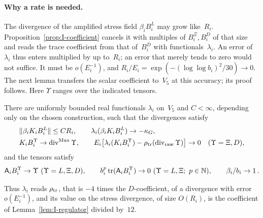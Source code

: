 \paragraph{Why a rate is needed.} The divergence of the amplified stress field $\beta_iB_i^L$ may grow like~$R_i$. Proposition~\ref{prop:I-coefficient} cancels it with multiples of $B_i^\Xi,B_i^D$ of that size and reads the trace coefficient from that of~$B_i^D$ with functionals~$\lambda_i$. An error of~$\lambda_i$ thus enters multiplied by up to~$R_i$; an error that merely tends to zero would not suffice. It must be $o(E_i^{-1})$, and $R_i/E_i=\exp(-(\log\log b_i)^2/30)\to0$.
The next lemma transfers the scalar coefficient to~$V_5$ at this accuracy; its proof follows. Here $\Upsilon$ ranges over the indicated tensors.
\begin{lemma}\label{lem:I-transfer}
There are uniformly bounded real functionals $\lambda_i$ on~$V_5$ and $C<\infty$, depending only on the chosen construction, such that the divergences satisfy
\begin{equation}\label{eq:I-divergence}
\begin{aligned}
&\|\beta_iK_iB_i^L\|\le CR_i,\qquad\lambda_i(\beta_iK_iB_i^L)\to-\kappa_G,\\
&K_iB_i^\Upsilon\to\operatorname{div}^{\rm Max}\Upsilon,\qquad E_i\bigl[\lambda_i(K_iB_i^\Upsilon)-\rho_{\rm tr}(\operatorname{div}_{\rm raw}\Upsilon)\bigr]\to0\quad(\Upsilon=\Xi,D),
\end{aligned}
\end{equation}
and the tensors satisfy
\begin{equation}\label{eq:I-tensor}
\mathsf A_iB_i^\Upsilon\to\Upsilon\ (\Upsilon=L,\Xi,D),\qquad
b_i^p\operatorname{tr}(\mathsf A_iB_i^\Upsilon)\to0\ (\Upsilon=L,\Xi;\ p\in\N),\qquad\beta_i/b_i\to1\,.
\end{equation}
\end{lemma}
Thus $\lambda_i$ reads $\rho_{\rm tr}$, that is $-4$ times the $D$-coefficient, of a divergence with error $o(E_i^{-1})$, and its value on the stress divergence, of size $O(R_i)$, is the coefficient of Lemma~\ref{lem:I-regulator} divided by~$12$.
